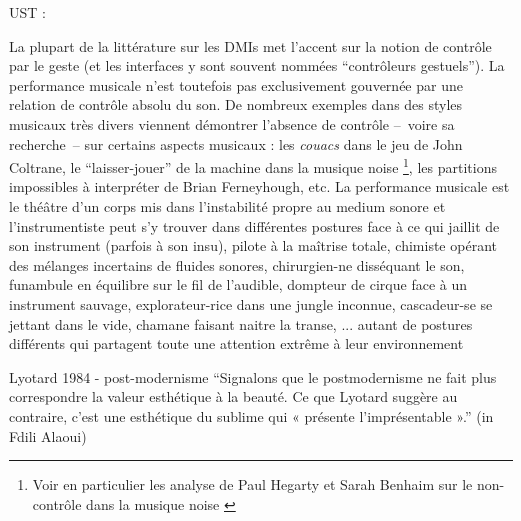\cite{cadoz_synthese_1981}

\cite{gibet_codage_1987}

\cite{cadoz_instrumental_1988}

\cite{delalande_geste_1988}

UST : \cite{delalande_les_1996}



\noindent La plupart de la littérature sur les \glspl{DMI} met l'accent sur la notion de contrôle par le geste (et les interfaces y sont souvent nommées ``contrôleurs gestuels''). La performance musicale n'est toutefois pas exclusivement gouvernée par une relation de contrôle absolu du son. De nombreux exemples dans des styles musicaux très divers viennent démontrer l'absence de contrôle --~voire sa recherche~-- sur certains aspects musicaux : les \textit{couacs} dans le jeu de John Coltrane, le ``laisser-jouer'' de la machine dans la musique noise \footnote{Voir en particulier les analyse de Paul Hegarty et Sarah Benhaim sur le non-contrôle dans la musique noise \cite{hegarty_noise_2007, benhaim_aux_2018}}, les partitions impossibles à interpréter de Brian Ferneyhough, etc. La performance musicale est le théâtre d'un corps mis dans l'instabilité propre au medium sonore et l'instrumentiste peut s'y trouver dans différentes postures face à ce qui jaillit de son instrument (parfois à son insu), pilote à la maîtrise totale, chimiste opérant des mélanges incertains de fluides sonores, chirurgien-ne disséquant le son, funambule en équilibre sur le fil de l'audible, dompteur de cirque face à un instrument sauvage, explorateur-rice dans une jungle inconnue, cascadeur-se se jettant dans le vide, chamane faisant naitre la transe, ... autant de postures différents qui partagent toute une attention extrême à leur environnement


Lyotard 1984 - post-modernisme ``Signalons que le postmodernisme ne fait plus correspondre la valeur esthétique à la beauté. Ce que Lyotard suggère au contraire, c’est une esthétique du sublime qui « présente l’imprésentable ».'' (in Fdili Alaoui)



